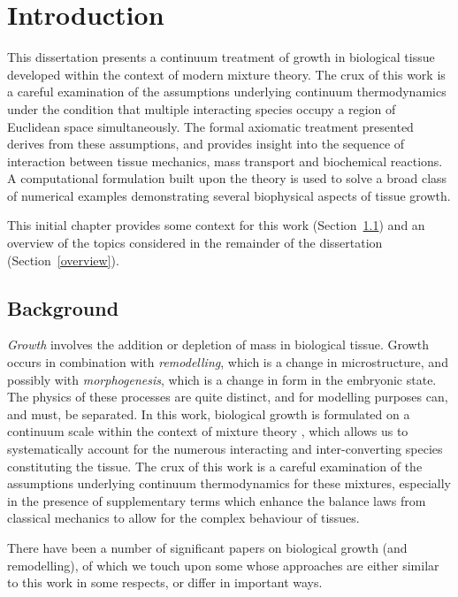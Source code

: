 \chapter{Introduction}
\label{introduction}

This dissertation presents a continuum treatment of growth in
biological tissue developed within the context of modern mixture
theory. The crux of this work is a careful examination of the
assumptions underlying continuum thermodynamics under the condition
that multiple interacting species occupy a region of Euclidean space
simultaneously. The formal axiomatic treatment presented derives from
these assumptions, and provides insight into the sequence of
interaction between tissue mechanics, mass transport and biochemical
reactions. A computational formulation built upon the theory is used
to solve a broad class of numerical examples demonstrating several
biophysical aspects of tissue growth.

This initial chapter provides some context for this work
(Section~\ref{background}) and an overview of the topics considered in
the remainder of the dissertation (Section~\ref{overview}).

\section{Background}
\label{background}

\emph{Growth} involves the addition or depletion of mass in biological
tissue. Growth occurs in combination with \emph{remodelling}, which is
a change in microstructure, and possibly with \emph{morphogenesis},
which is a change in form in the embryonic state. The physics of these
processes are quite distinct, and for modelling purposes can, and
must, be separated. In this work, biological growth is formulated on a
continuum scale within the context of mixture theory
\citep{TruesdellToupin:60, TruesdellNoll:65, BedfordDrumheller:1983},
which allows us to systematically account for the numerous interacting
and inter-converting species constituting the tissue. The crux of this
work is a careful examination of the assumptions underlying continuum
thermodynamics for these mixtures, especially in the presence of
supplementary terms which enhance the balance laws from classical
mechanics to allow for the complex behaviour of tissues.

There have been a number of significant papers on biological growth
(and remodelling), of which we touch upon some whose approaches are
either similar to this work in some respects, or differ in important
ways.

